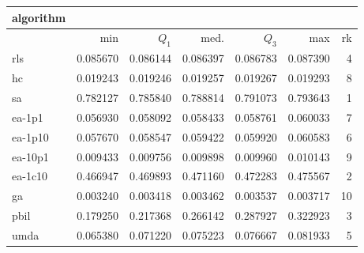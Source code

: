 \begin{tabular}{@{}l*{5}{>{{}}N{1}{3}}>{{}}N{2}{0}@{}}
\toprule
{algorithm} &  \\
\midrule
& {min} & {$Q_1$} & {med.} & {$Q_3$} & {max} & {rk}\\
\midrule
rls & 0.085670 & 0.086144 & 0.086397 & 0.086783 & 0.087390 & 4\\
hc & 0.019243 & 0.019246 & 0.019257 & 0.019267 & 0.019293 & 8\\
sa & {\color{blue}} 0.782127 & {\color{blue}} 0.785840 & {\color{blue}} 0.788814 & {\color{blue}} 0.791073 & {\color{blue}} 0.793643 & 1\\
ea-1p1 & 0.056930 & 0.058092 & 0.058433 & 0.058761 & 0.060033 & 7\\
ea-1p10 & 0.057670 & 0.058547 & 0.059422 & 0.059920 & 0.060583 & 6\\
ea-10p1 & 0.009433 & 0.009756 & 0.009898 & 0.009960 & 0.010143 & 9\\
ea-1c10 & 0.466947 & 0.469893 & 0.471160 & 0.472283 & 0.475567 & 2\\
ga & 0.003240 & 0.003418 & 0.003462 & 0.003537 & 0.003717 & 10\\
pbil & 0.179250 & 0.217368 & 0.266142 & 0.287927 & 0.322923 & 3\\
umda & 0.065380 & 0.071220 & 0.075223 & 0.076667 & 0.081933 & 5\\
\bottomrule
\end{tabular}
